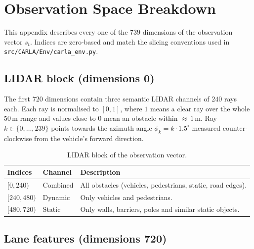 
\chapter{Observation Space Breakdown}\label{app:observation}

This appendix describes every one of the \(739\) dimensions of the observation vector
\(s_t\). Indices are zero-based and match the slicing conventions used in
\texttt{src/CARLA/Env/carla\_env.py}.

\section{LIDAR block (dimensions 0)}\label{app:obs-lidar}

The first \(720\) dimensions contain three semantic LIDAR channels of \(240\) rays each. Each ray
is normalised to \([0, 1]\), where \(1\) means a clear ray over the whole \(50\,\mathrm{m}\)
range and values close to \(0\) mean an obstacle within \({\approx}\,1\,\mathrm{m}\). Ray
\(k\in\{0,\ldots,239\}\) points towards the azimuth angle \(\phi_k = k \cdot 1.5^\circ\)
measured counter-clockwise from the vehicle's forward direction.

\begin{table}[H]
  \centering
  \caption{LIDAR block of the observation vector.}
  \label{tab:obs-lidar}
  \small
  \begin{tabular}{@{}lll@{}}
    \toprule
    \textbf{Indices} & \textbf{Channel} & \textbf{Description} \\
    \midrule
    \([0, 240)\)   & Combined  & All obstacles (vehicles, pedestrians, static, road edges). \\
    \([240, 480)\) & Dynamic   & Only vehicles and pedestrians. \\
    \([480, 720)\) & Static    & Only walls, barriers, poles and similar static objects. \\
    \bottomrule
  \end{tabular}
\end{table}

\section{Lane features (dimensions 720)}\label{app:obs-lane}


